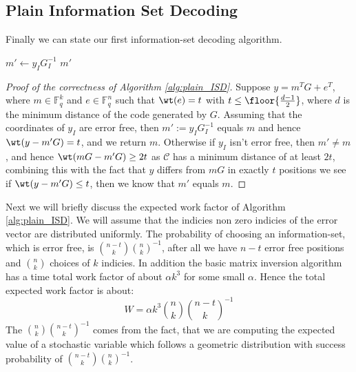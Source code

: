 \subsection{Plain Information Set Decoding}
Finally we can state our first information-set decoding algorithm.
\begin{algorithm}[H]
\caption{Plain information-set decoding}\label{alg:plain_ISD}
\begin{algorithmic}
  \State $m' \gets y_IG_I^{-1}$
  \State \Return $m'$
  \EndIf
  \EndFor
  \EndProcedure
\end{algorithmic}
\end{algorithm}

\begin{proof}[Proof of the correctness of Algorithm \ref{alg:plain_ISD}]
  Suppose $y = m^TG + e^T$, where $m \in \mathbb{F}_q^{k}$ and $e \in \mathbb{F}_q^n$ such that $\wt(e) = t$ with  $t \leq \floor{\frac{d - 1}{2}}$, where $d$ is the minimum distance of the code generated by $G$. Assuming that the coordinates of $y_I$ are error free, then $m' := y_IG_I^{-1}$ equals $m$ and hence $\wt(y - m'G) = t$, and we return $m$. Otherwise if $y_I$ isn't error free, then $m' \neq m$, and hence $\wt(mG - m'G) \geq 2t$ as $\mathcal{C}$ has a minimum distance of at least $2t$, combining this with the fact that $y$ differs from $mG$ in exactly $t$ positions we see if $\wt(y - m'G) \leq t$, then we know that $m'$ equals $m$.
\end{proof}
Next we will briefly discuss the expected work factor of Algorithm \ref{alg:plain_ISD}. We will assume that the indicies non zero indicies of the error vector are distributed uniformly. The probability of choosing an information-set, which is error free, is $\binom{n - t}{k} \binom{n}{k}^{-1}$, after all we have $n - t$ error free positions and $\binom{n}{k}$ choices of $k$ indicies. In addition the basic matrix inversion algorithm has a time total work factor of about $\alpha k^3$ for some small $\alpha$. Hence the total expected work factor is about:
\begin{equation*}
  W = \alpha k^3 \binom{n}{k} \binom{n - t}{k}^{-1}
\end{equation*}
The $\binom{n}{k} \binom{n - t}{k}^{-1}$ comes from the fact, that we are computing the expected value of a stochastic variable which follows a geometric distribution with success probability of $\binom{n - t}{k} \binom{n}{k}^{-1}$.
